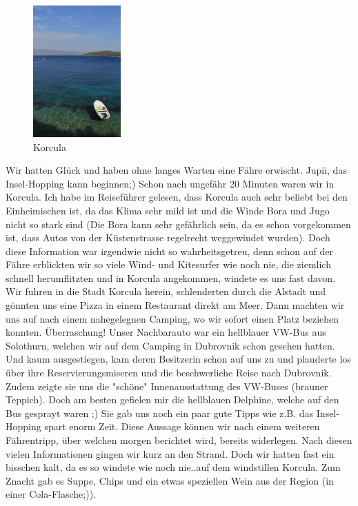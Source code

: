 \begin{figure}[H]
    \centering
    \includegraphics[width=0.3\textwidth]{../Bilder/Sommer2012/74.jpg}
    \caption{Korcula}
    \label{img:Sommer8}
\end{figure}

Wir hatten Glück und haben ohne langes Warten eine Fähre erwischt.
Jupii, das Insel-Hopping kann beginnen;) Schon nach ungefähr 20 Minuten waren wir in Korcula.
Ich habe im Reiseführer gelesen, dass Korcula auch sehr beliebt bei den Einheimischen ist, da das Klima sehr mild ist und die Winde Bora und Jugo nicht so stark sind (Die Bora kann sehr gefährlich sein, da es schon vorgekommen ist, dass Autos von der Küstenstrasse regelrecht weggewindet wurden).
Doch diese Information war irgendwie nicht so wahrheitsgetreu, denn schon auf der Fähre erblickten wir so viele Wind- und Kitesurfer wie noch nie, die ziemlich schnell herumflitzten und in Korcula angekommen, windete es uns fast davon.
Wir fuhren in die Stadt Korcula herein, schlenderten durch die Alstadt und gönnten uns eine Pizza in einem Restaurant direkt am Meer.
Dann machten wir uns auf nach einem nahegelegnen Camping, wo wir sofort einen Platz beziehen konnten.
Überraschung! Unser Nachbarauto war ein hellblauer VW-Bus aus Solothurn, welchen wir auf dem Camping in Dubrovnik schon gesehen hatten.
Und kaum ausgestiegen, kam deren Besitzerin schon auf uns zu und plauderte los über ihre Reservierungsmiseren und die beschwerliche Reise nach Dubrovnik.
Zudem zeigte sie uns die "schöne" Innenausstattung des VW-Buses (brauner Teppich).
Doch am besten gefielen mir die hellblauen Delphine, welche auf den Bus gesprayt waren ;) Sie gab uns noch ein paar gute Tipps wie z.B. das Insel-Hopping spart enorm Zeit.
Diese Aussage können wir nach einem weiteren Fährentripp, über welchen morgen berichtet wird, bereits widerlegen.
Nach diesen vielen Informationen gingen wir kurz an den Strand.
Doch wir hatten fast ein bisschen kalt, da es so windete wie noch nie..auf dem windstillen Korcula.
Zum Znacht gab es Suppe, Chips und ein etwas speziellen Wein aus der Region (in einer Cola-Flasche;)).

